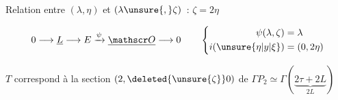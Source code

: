 
Relation entre $(\lambda,\eta)$ et $(\lambda\unsure{,}\zeta)$~: $\zeta=2\eta$


\[
0\longrightarrow\underline L\longrightarrow E\xrightarrow{\psi}\underline{\mathscr O}\longrightarrow0\qquad\left\{\begin{aligned}\psi(\lambda,\zeta)&=\lambda\\i(\unsure{\eta|y|\xi})&=(0,2\eta)\end{aligned}\right.
\]

$T$ correspond à la section $(2,\deleted{\unsure{\zeta}}0)$ de $\Gamma P_2\simeq\Gamma(\underbrace{2\tau+2L}_{2L})$


